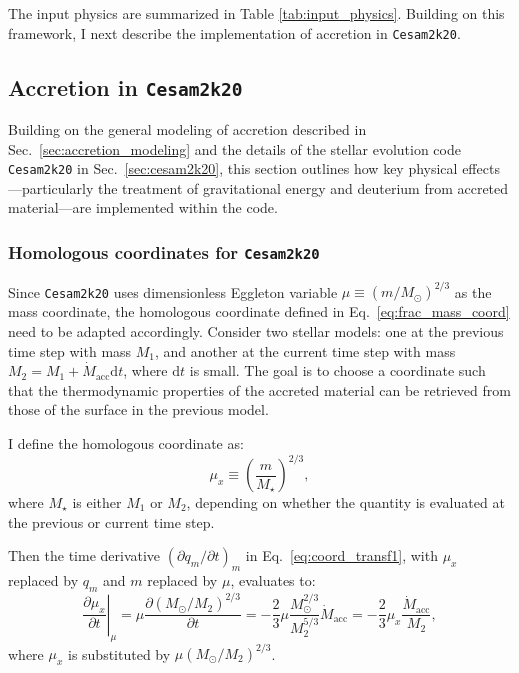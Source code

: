 \documentclass[12pt,a4paper]{article}
\newcommand{\mr}{\mathrm}
\newcommand{\pfird}[2][]{\frac{\partial#1}{\partial#2}}
\newcommand{\dd}[1]{\mathrm{d}#1}
\begin{document}
The input physics are summarized in Table \ref{tab:input_physics}. Building on this framework, I next describe the implementation of accretion in \texttt{Cesam2k20}.

\subsection{Accretion in \texttt{Cesam2k20}}
\label{sec:accretion_cesam2k20}

Building on the general modeling of accretion described in Sec.~\ref{sec:accretion_modeling} and the details of the stellar evolution code \texttt{Cesam2k20} in Sec.~\ref{sec:cesam2k20}, this section outlines how key physical effects—particularly the treatment of gravitational energy and deuterium from accreted material—are implemented within the code.

\subsubsection{Homologous coordinates for \texttt{Cesam2k20}}
\label{sec:homologous_coord_cesam}

Since \texttt{Cesam2k20} uses dimensionless Eggleton variable $\mu \equiv \left(m/M_\odot\right)^{2/3}$ as the mass coordinate, the homologous coordinate defined in Eq.~\eqref{eq:frac_mass_coord} need to be adapted accordingly. Consider two stellar models: one at the previous time step with mass $M_1$, and another at the current time step with mass $M_2 = M_1 + \dot{M}_\mr{acc} \dd{t}$, where $\dd{t}$ is small. The goal is to choose a coordinate such that the thermodynamic properties of the accreted material can be retrieved from those of the surface in the previous model.

I define the homologous coordinate as:
\begin{equation}
  \mu_x \equiv \left( \frac{m}{M_\star} \right)^{2/3},
\end{equation}
where $M_\star$ is either $M_1$ or $M_2$, depending on whether the quantity is evaluated at the previous or current time step.

Then the time derivative $\left(\partial q_m/\partial t\right)_m$ in Eq.~\eqref{eq:coord_transf1}, with $\mu_x$ replaced by $q_m$ and $m$ replaced by $\mu$, evaluates to:
\begin{equation}
  \left.\pfird[\mu_x]{t}\right|_\mu = \mu\pfird[\left(M_\odot/M_2\right)^{2/3}]{t} = -\frac{2}{3}\mu\frac{M_\odot^{2/3}}{M_2^{5/3}}\dot{M}_\mr{acc} = -\frac{2}{3}\mu_x\frac{\dot{M}_\mr{acc}}{M_2}, \label{eq:dmux_dt_mu}
\end{equation}
where $\mu_x$ is substituted by $\mu\left(M_\odot/M_2\right)^{2/3}$. 
\end{document}
